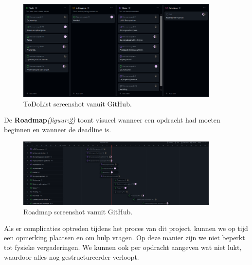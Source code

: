 \begin{figure}[h]
    \centering
    \includegraphics[width=0.9\textwidth]{IMG/todolist.PNG}
    \caption{ToDoList screenshot vanuit GitHub.}
    \label{fig:todolist}
\end{figure}

De \textbf{Roadmap}\textit{(figuur:\ref{fig:roadmap})} toont visueel wanneer een opdracht had moeten beginnen en wanneer de deadline is.

\begin{figure}[h]
    \centering
    \includegraphics[width=0.9\textwidth]{IMG/roadmap.PNG}
    \caption{Roadmap screenshot vanuit GitHub.}
    \label{fig:roadmap}
\end{figure}
Als er complicaties optreden tijdens het proces van dit project, kunnen we op tijd een opmerking plaatsen en om hulp vragen. Op deze manier zijn we niet beperkt tot fysieke vergaderingen. We kunnen ook per opdracht aangeven wat niet lukt, waardoor alles nog gestructureerder verloopt.






